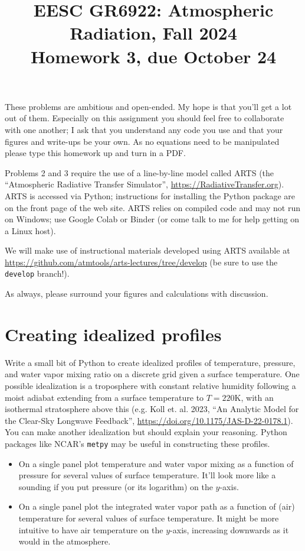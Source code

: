 \documentclass{article}
\title{EESC GR6922: Atmospheric Radiation, Fall 2024 \\  Homework 3, due October 24}
\begin{document}
\maketitle
These problems are  ambitious and open-ended. My hope is that you'll get a lot out of them. Especially on this assignment you should feel free to collaborate with one another; I ask that you understand any code you use and that your figures and write-ups be your own. As no equations need to be manipulated please type this homework up and turn in a PDF. 

Problems 2 and 3 require the use of a line-by-line model called ARTS (the ``Atmospheric Radiative Transfer Simulator'',  \url{https://RadiativeTransfer.org}). ARTS is accessed via Python; instructions for installing the Python package are on the front page of the web site. ARTS relies on compiled code and may not run on Windows; use Google Colab or Binder (or come talk to me for help getting on a Linux host). 

We will make use of instructional materials developed using ARTS available at \url{https://github.com/atmtools/arts-lectures/tree/develop} (be sure to use the {\tt develop} branch!).

As always, please surround your figures and calculations with discussion. 

\section{Creating idealized profiles}

Write a small bit of Python to create idealized profiles of temperature, pressure, and water vapor mixing ratio on a discrete grid given a surface temperature. One possible idealization is a troposphere with constant relative humidity following a moist adiabat extending from a surface temperature to $T = 220 \si{\kelvin}$, with an isothermal stratosphere above this (e.g. Koll et. al. 2023, ``An Analytic Model for the Clear-Sky Longwave Feedback'', \url{https://doi.org/10.1175/JAS-D-22-0178.1}). You can make another idealization but should explain your reasoning. Python packages like NCAR's {\tt metpy} may be useful in constructing these profiles. 

\begin{itemize}
\item On a single panel plot temperature and water vapor mixing as a function of pressure for several values of surface temperature. It'll look more like a sounding if you put pressure (or its logarithm) on the $y$-axis. 
\item On a single panel plot the integrated water vapor path as a function of (air) temperature for several values of surface temperature. It might be more intuitive to have air temperature on the $y$-axis, increasing downwards as it would in the atmosphere. 
\end{itemize}
\end{document}
